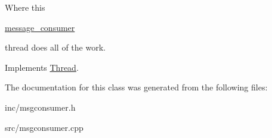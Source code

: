 Where this
\begin{DoxyCode}
\hyperlink{classbattleship_1_1game__server_1_1message__consumer_a266c52a9e282be54a95c1338432ead58}{message\_consumer} 
\end{DoxyCode}
 thread does all of the work. 

Implements \hyperlink{classThread}{Thread}.



The documentation for this class was generated from the following files\+:\begin{DoxyCompactItemize}
\item 
inc/msgconsumer.\+h\item 
src/msgconsumer.\+cpp\end{DoxyCompactItemize}
